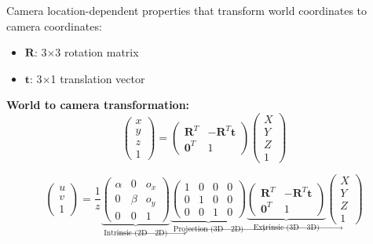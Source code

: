 \separator

\begin{defbox}
Camera location-dependent properties that transform world coordinates to camera coordinates:
\begin{itemize}
  \item $\mathbf{R}$: 3$\times$3 rotation matrix
  \item $\mathbf{t}$: 3$\times$1 translation vector
\end{itemize}
\end{defbox}

\textbf{World to camera transformation:}
\[
\begin{pmatrix} x \\ y \\ z \\ 1 \end{pmatrix} = \begin{pmatrix} \mathbf{R}^T & -\mathbf{R}^T\mathbf{t} \\ \mathbf{0}^T & 1 \end{pmatrix} \begin{pmatrix} X \\ Y \\ Z \\ 1 \end{pmatrix}
\]

\separator

\begin{thmbox}
\[
\begin{pmatrix} u \\ v \\ 1 \end{pmatrix} = \frac{1}{z} \underbrace{\begin{pmatrix} \alpha & 0 & o_x \\ 0 & \beta & o_y \\ 0 & 0 & 1 \end{pmatrix}}_{\text{Intrinsic (2D$\rightarrow$2D)}} \underbrace{\begin{pmatrix} 1 & 0 & 0 & 0 \\ 0 & 1 & 0 & 0 \\ 0 & 0 & 1 & 0 \end{pmatrix}}_{\text{Projection (3D$\rightarrow$2D)}} \underbrace{\begin{pmatrix} \mathbf{R}^T & -\mathbf{R}^T\mathbf{t} \\ \mathbf{0}^T & 1 \end{pmatrix}}_{\text{Extrinsic (3D$\rightarrow$3D)}} \begin{pmatrix} X \\ Y \\ Z \\ 1 \end{pmatrix}
\]
\end{thmbox}

